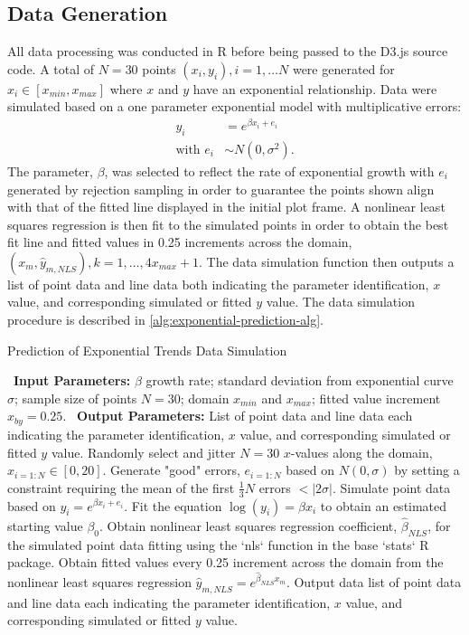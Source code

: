 \documentclass[print]{nuthesis}
\begin{document}
\hypertarget{data-generation-2}{%
\subsection{Data Generation}\label{data-generation-2}}

All data processing was conducted in R before being passed to the D3.js source code.
A total of \(N = 30\) points \((x_i, y_i), i = 1,...N\) were generated for \(x_i\in [x_{min}, x_{max}]\) where \(x\) and \(y\) have an exponential relationship.
Data were simulated based on a one parameter exponential model with multiplicative errors:
\begin{align}
y_i & = e^{\beta x_i + e_i} \\
\text{with } e_i & \sim N(0, \sigma^2). \nonumber
\end{align}
The parameter, \(\beta\), was selected to reflect the rate of exponential growth with \(e_i\) generated by rejection sampling in order to guarantee the points shown align with that of the fitted line displayed in the initial plot frame.
A nonlinear least squares regression is then fit to the simulated points in order to obtain the best fit line and fitted values in 0.25 increments across the domain, \((x_m, \hat y_{m,NLS}), k = 1, ..., 4 x_{max} +1\).
The data simulation function then outputs a list of point data and line data both indicating the parameter identification, \(x\) value, and corresponding simulated or fitted \(y\) value.
The data simulation procedure is described in \cref{alg:exponential-prediction-alg}.

\begin{algorithm}
  \caption{Prediction of Exponential Trends Data Simulation}\label{alg:exponential-prediction-alg}
  \begin{algorithmic}[1]
    \Statex \textbullet~\textbf{Input Parameters:} $\beta$ growth rate; standard deviation from exponential curve $\sigma$; sample size of points $N = 30$; domain $x_{min}$ and $x_{max}$; fitted value increment $x_{by} = 0.25$.
    \Statex \textbullet~\textbf{Output Parameters:} List of point data and line data each indicating the parameter identification, $x$ value, and corresponding simulated or fitted $y$ value.
    \State Randomly select and jitter $N = 30$ $x$-values along the domain, $x_{i=1:N}\in [0, 20]$.
    \State Generate "good" errors, $e_{i = 1:N}$ based on $N(0,\sigma)$ by setting a constraint requiring the mean of the first $\frac{1}{3} N$ errors $< |2\sigma|.$
    \State Simulate point data based on $y_i = e^{\beta x_i + e_i}$.
    \State Fit the equation $\log(y_i) = \beta x_i$ to obtain an estimated starting value $\beta_0$. 
    \State Obtain nonlinear least squares regression coefficient, $\hat\beta_{NLS}$, for the simulated point data fitting using the `nls` function in the base `stats` R package.
    \State Obtain fitted values every 0.25 increment across the domain from the nonlinear least squares regression $\hat y_{m,NLS} = e^{\hat\beta_{NLS} x_m}$.
    \State Output data list of point data and line data each indicating the parameter identification, $x$ value, and corresponding simulated or fitted $y$ value.
  \end{algorithmic}
\end{algorithm}
\end{document}
